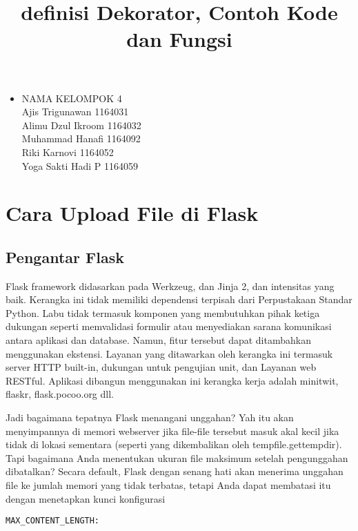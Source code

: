 \documentclass[12pt,a4paper]{article}
\begin{document}
\title{definisi Dekorator, Contoh Kode dan Fungsi}
\maketitle

\begin{itemize}

\item
NAMA KELOMPOK 4\\
Ajis Trigunawan			1164031\\
Alimu Dzul Ikroom		1164032\\
Muhammad Hanafi			1164092\\
Riki Karnovi			1164052\\
Yoga Sakti Hadi P		1164059\\

\end{itemize}

\section{Cara Upload File di Flask}

\subsection{Pengantar Flask}

Flask framework didasarkan pada Werkzeug, dan Jinja 2, dan intensitas yang baik. Kerangka ini tidak memiliki dependensi terpisah dari
Perpustakaan Standar Python. Labu tidak termasuk komponen yang membutuhkan pihak ketiga dukungan seperti memvalidasi formulir atau menyediakan sarana komunikasi antara aplikasi dan database. Namun, fitur tersebut dapat ditambahkan menggunakan ekstensi. Layanan yang ditawarkan oleh kerangka ini termasuk server HTTP built-in, dukungan untuk pengujian unit, dan Layanan web RESTful. Aplikasi dibangun menggunakan ini kerangka kerja adalah minitwit, flaskr, flask.pocoo.org dll.

Jadi bagaimana tepatnya Flask menangani unggahan? Yah itu akan menyimpannya di memori webserver jika file-file tersebut masuk akal kecil jika tidak di lokasi sementara (seperti yang dikembalikan oleh tempfile.gettempdir). Tapi bagaimana Anda menentukan ukuran file maksimum setelah pengunggahan dibatalkan? Secara default, Flask dengan senang hati akan menerima unggahan file ke jumlah memori yang tidak terbatas, tetapi Anda dapat membatasi itu dengan menetapkan kunci konfigurasi 

\begin{verbatim}
MAX_CONTENT_LENGTH:
\end{verbatim}
\end{document}
